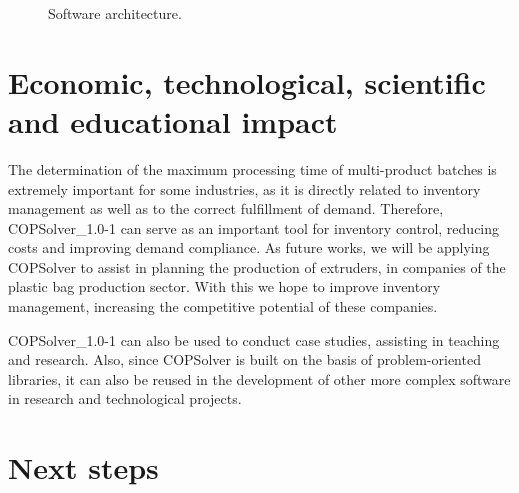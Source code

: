 \documentclass[11pt, letterpaper]{article}
\begin{document}
\begin{figure}[h]
\begin{center}
\end{center}
\caption{Software architecture.}
\end{figure}

\section{Economic, technological, scientific and educational impact}

The determination of the maximum processing time of multi-product batches is extremely important for some industries, as it is directly related to inventory management as well as to the correct fulfillment of demand. Therefore, COPSolver\_1.0-1 can serve as an important tool for inventory control, reducing costs and improving demand compliance. As future works, we will be applying COPSolver to assist in planning the production of extruders, in companies of the plastic bag production sector. With this we hope to improve inventory management, increasing the competitive potential of these companies.

COPSolver\_1.0-1 can also be used to conduct case studies, assisting in teaching and research. Also, since COPSolver is built on the basis of problem-oriented libraries, it can also be reused in the development of other more complex software in research and technological projects.

\section{Next steps}
\end{document}
